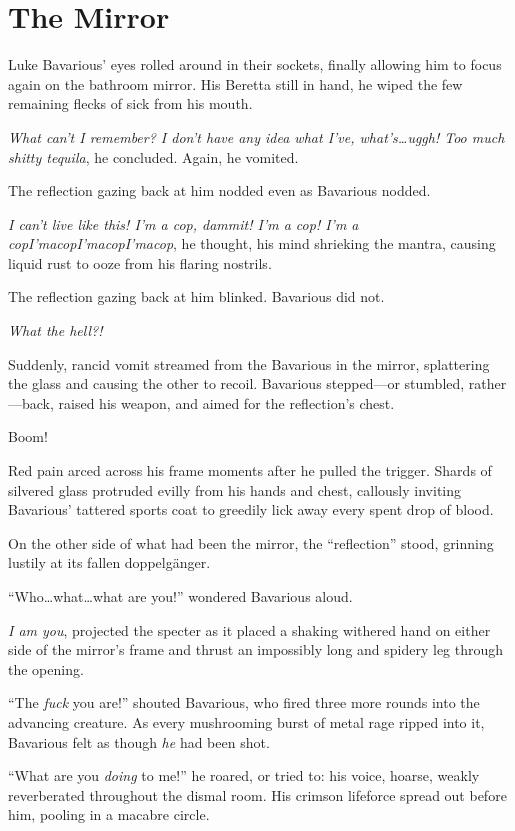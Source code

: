 \chapter{The Mirror}

Luke Bavarious' eyes rolled around in their sockets, finally allowing
him to focus again on the bathroom mirror. His Beretta still in hand, he
wiped the few remaining flecks of sick from his mouth.

{\em What can't I remember? I don't have any idea what I've,
  what's\ldots uggh!  Too much shitty tequila}, he concluded. Again, he
vomited.

The reflection gazing back at him nodded even as Bavarious nodded.

{\em I can't live like this! I'm a cop, dammit! I'm a cop! I'm a
  copI'macopI'macopI'macop}, he thought, his mind shrieking the mantra,
causing liquid rust to ooze from his flaring nostrils.

The reflection gazing back at him blinked. Bavarious did not.

{\em What the hell?!}

Suddenly, rancid vomit streamed from the Bavarious in the mirror,
splattering the glass and causing the other to recoil. Bavarious
stepped---or stumbled, rather---back, raised his weapon, and aimed for
the reflection's chest.

{\sc Boom!}

Red pain arced across his frame moments after he pulled the
trigger. Shards of silvered glass protruded evilly from his hands and
chest, callously inviting Bavarious' tattered sports coat to greedily
lick away every spent drop of blood.

On the other side of what had been the mirror, the ``reflection'' stood,
grinning lustily at its fallen doppelgänger.

``Who\ldots what\ldots what are you!'' wondered Bavarious aloud.

{\em I am you}, projected the specter as it placed a shaking withered
hand on either side of the mirror's frame and thrust an impossibly long
and spidery leg through the opening.

``The {\em fuck} you are!'' shouted Bavarious, who fired three more
rounds into the advancing creature. As every mushrooming burst of metal
rage ripped into it, Bavarious felt as though {\em he} had been shot.

``What are you {\em doing} to me!'' he roared, or tried to: his voice,
hoarse, weakly reverberated throughout the dismal room. His crimson
lifeforce spread out before him, pooling in a macabre circle.

